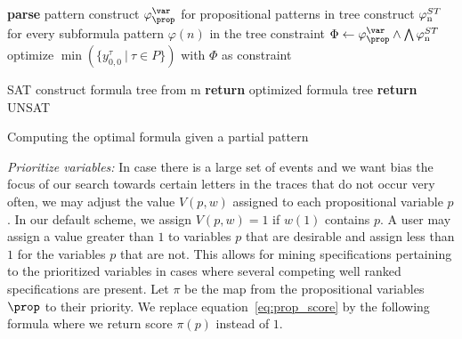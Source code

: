 \begin{algorithm}
    \begin{algorithmic}[1]
         
        
            \State \textbf{parse} pattern 
            \State construct $\varphi^{\var}_\prop$ for propositional patterns in tree
            \State construct $\varphi^{ST}_\textnormal{n}$ for every subformula pattern $\varphi(n)$ in the tree
            \State constraint $\Phi \leftarrow \varphi^{\var}_\prop \land \bigwedge \varphi^{ST}_\textnormal{n}$
            \State optimize
            $\min( \{y_{0,0}^\tau\: |\: \tau \in P\} )$ with $\Phi$ as constraint
            
             \Comment SAT \State
                construct formula tree from m \State \textbf{return}
                optimized formula tree \Else \State \textbf{return} UNSAT \EndIf
                \EndProcedure
    \end{algorithmic}
    \caption{Computing the optimal formula given a partial pattern}
    \label{algo:hybrid}
\end{algorithm}

\emph{Prioritize variables: }
%
In case there is a large set of events and we want bias the focus of our search
towards certain letters in the traces that do not occur very often, we may
adjust the value $V(p,w)$ assigned to each propositional variable $p$.
%
In our default scheme, we assign $V(p,w) = 1$ if $w(1)$ contains $p$.
%
A user may assign a value greater than $1$ to variables $p$ that are desirable
and assign less than $1$ for the variables $p$ that are not.
%
This allows for mining specifications pertaining to the prioritized variables in
cases where several competing well ranked specifications are present.
%
Let $\pi$ be the map from the propositional variables $\prop$ to their priority.
%
We replace equation~\eqref{eq:prop_score} by the following formula where we
return score $\pi(p)$ instead of $1$. 

